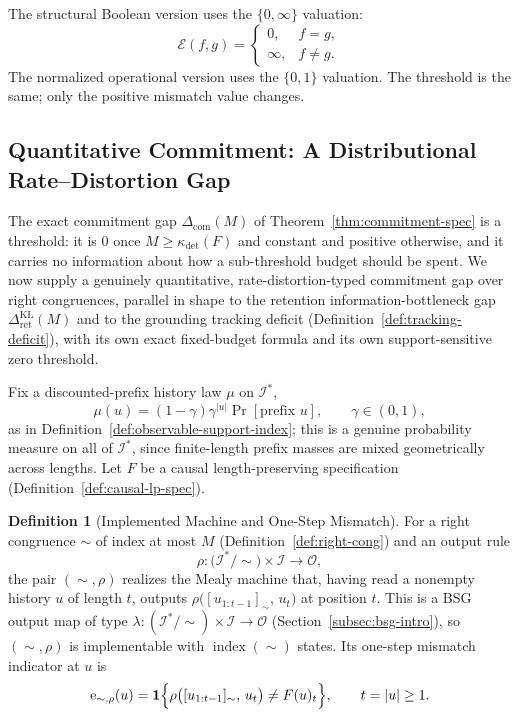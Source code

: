\documentclass[12pt]{article}
\theoremstyle{definition}
\newtheorem{definition}[theorem]{Definition}
\newcommand{\RetKL}{\Delta_{\mathrm{ret}}^{\mathrm{KL}}}
\newcommand{\Com}{\Delta_{\mathrm{com}}}
\newcommand{\Comex}{\Com}
\begin{document}
The structural Boolean version uses the $\{0,\infty\}$ valuation:
\[
\mathcal E(f,g)=
\begin{cases}
0,&f=g,\\
\infty,&f\neq g.
\end{cases}
\]
The normalized operational version uses the $\{0,1\}$ valuation.  The threshold
is the same; only the positive mismatch value changes.

\subsection{Quantitative Commitment: A Distributional Rate--Distortion Gap}
\label{subsec:commitment-rd}

The exact commitment gap $\Comex(M)$ of Theorem~\ref{thm:commitment-spec} is
a threshold: it is $0$ once $M\ge\kappa_{\det}(F)$ and constant and positive
otherwise, and it carries no information about how a sub-threshold budget
should be spent.  We now supply a genuinely quantitative, rate-distortion-typed
commitment gap over right congruences, parallel in shape to the retention
information-bottleneck gap $\RetKL(M)$ and to the grounding tracking deficit
(Definition~\ref{def:tracking-deficit}), with its own exact fixed-budget
formula and its own support-sensitive zero threshold.

Fix a discounted-prefix history law $\mu$ on $\mathcal I^*$,
\[
\mu(u)=(1-\gamma)\gamma^{|u|}\Pr[\text{prefix }u],
\qquad \gamma\in(0,1),
\]
as in Definition~\ref{def:observable-support-index}; this is a genuine
probability measure on all of $\mathcal I^*$, since finite-length prefix
masses are mixed geometrically across lengths.  Let $F$ be a causal
length-preserving specification (Definition~\ref{def:causal-lp-spec}).

\begin{definition}[Implemented Machine and One-Step Mismatch]
\label{def:com-rd-machine}
For a right congruence $\sim$ of index at most $M$
(Definition~\ref{def:right-cong}) and an output rule
\[
\rho:\bigl(\mathcal I^*/\!\sim\bigr)\times\mathcal I\to\mathcal O,
\]
the pair $(\sim,\rho)$ realizes the Mealy machine that, having read a
nonempty history $u$ of length $t$, outputs
$\rho\bigl([u_{1:t-1}]_\sim,\,u_t\bigr)$
at position $t$.  This is a BSG output map of type
$\lambda:(\mathcal I^*/\!\sim)\times\mathcal I\to\mathcal O$
(Section~\ref{subsec:bsg-intro}), so $(\sim,\rho)$ is implementable with
$\operatorname{index}(\sim)$ states.  Its one-step mismatch indicator at $u$
is
\[
\mathrm e_{\sim,\rho}(u)
=
\mathbf 1
\Bigl\{
\rho\bigl([u_{1:t-1}]_\sim,\,u_t\bigr)
\ne
F(u)_t
\Bigr\},
\qquad t=|u|\ge1.
\]
\end{definition}
\end{document}
